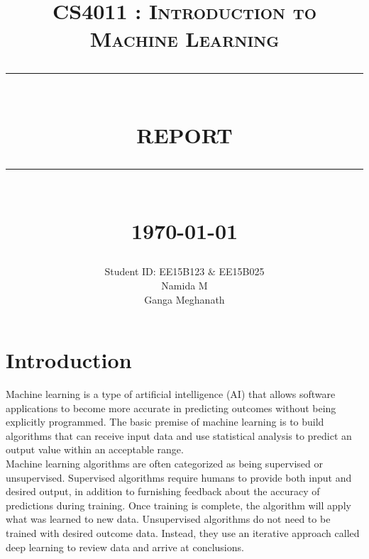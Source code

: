 \documentclass[12pt]{report}
\newcommand{\HRule}[1]{\rule{\linewidth}{#1}}
\begin{document}
\title{ \normalsize \textsc{CS4011 : Introduction to Machine Learning}
		\\ [2.0cm]
		\HRule{0.5pt} \\
		\LARGE \textbf{\uppercase{Report}}
		\HRule{2pt} \\ [0.5cm]
		\normalsize \today \vspace*{5\baselineskip}}

\date{}

\author{
		Student ID: EE15B123 ${\&}$ EE15B025 \\ 
		Namida M \\
		Ganga Meghanath }

\renewcommand\thesection{\arabic{section}}
\maketitle
\tableofcontents
\newpage

\sectionfont{\scshape}


\section{Introduction}
Machine learning is a type of artificial intelligence (AI) that allows software applications to become more accurate in predicting outcomes without being explicitly programmed. The basic premise of machine learning is to build algorithms that can receive input data and use statistical analysis to predict an output value within an acceptable range. \\

Machine learning algorithms are often categorized as being supervised or unsupervised. Supervised algorithms require humans to provide both input and desired output, in addition to furnishing feedback about the accuracy of predictions during training. Once training is complete, the algorithm will apply what was learned to new data. Unsupervised algorithms do not need to be trained with desired outcome data. Instead, they use an iterative approach called deep learning to review data and arrive at conclusions.
\end{document}

